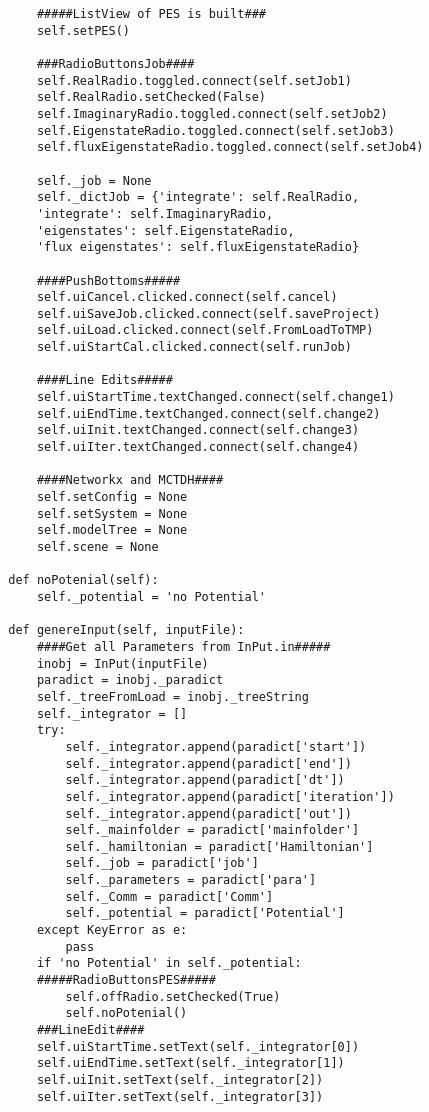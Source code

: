 \begin{verbatim}
            #####ListView of PES is built###
            self.setPES()
    
            ###RadioButtonsJob####
            self.RealRadio.toggled.connect(self.setJob1)
            self.RealRadio.setChecked(False)
            self.ImaginaryRadio.toggled.connect(self.setJob2)
            self.EigenstateRadio.toggled.connect(self.setJob3)
            self.fluxEigenstateRadio.toggled.connect(self.setJob4)
    
            self._job = None
            self._dictJob = {'integrate': self.RealRadio,
            'integrate': self.ImaginaryRadio,
            'eigenstates': self.EigenstateRadio,
            'flux eigenstates': self.fluxEigenstateRadio}
    
            ####PushBottoms#####
            self.uiCancel.clicked.connect(self.cancel)
            self.uiSaveJob.clicked.connect(self.saveProject)
            self.uiLoad.clicked.connect(self.FromLoadToTMP)
            self.uiStartCal.clicked.connect(self.runJob)
    
            ####Line Edits#####
            self.uiStartTime.textChanged.connect(self.change1)
            self.uiEndTime.textChanged.connect(self.change2)
            self.uiInit.textChanged.connect(self.change3)
            self.uiIter.textChanged.connect(self.change4)
    
            ####Networkx and MCTDH####
            self.setConfig = None
            self.setSystem = None
            self.modelTree = None
            self.scene = None
    
        def noPotenial(self):
            self._potential = 'no Potential'
    
        def genereInput(self, inputFile):
            ####Get all Parameters from InPut.in#####
            inobj = InPut(inputFile) 
            paradict = inobj._paradict
            self._treeFromLoad = inobj._treeString
            self._integrator = []
            try:
                self._integrator.append(paradict['start'])
                self._integrator.append(paradict['end'])
                self._integrator.append(paradict['dt'])
                self._integrator.append(paradict['iteration'])
                self._integrator.append(paradict['out'])
                self._mainfolder = paradict['mainfolder']
                self._hamiltonian = paradict['Hamiltonian']
                self._job = paradict['job']
                self._parameters = paradict['para']
                self._Comm = paradict['Comm']
                self._potential = paradict['Potential']
            except KeyError as e:
                pass
            if 'no Potential' in self._potential:
            #####RadioButtonsPES#####
                self.offRadio.setChecked(True)
                self.noPotenial()
            ###LineEdit####
            self.uiStartTime.setText(self._integrator[0])
            self.uiEndTime.setText(self._integrator[1])
            self.uiInit.setText(self._integrator[2])
            self.uiIter.setText(self._integrator[3])
    

\end{verbatim}
